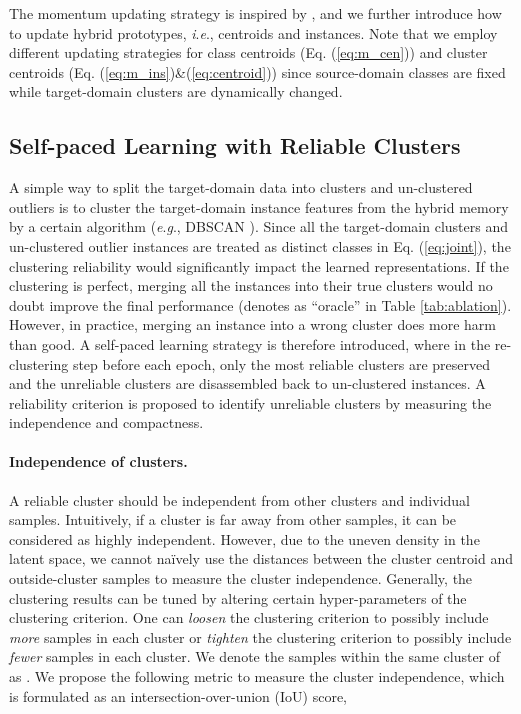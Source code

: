 \documentclass{article}
\newcommand{\ie}{\textit{i}.\textit{e}., }
\newcommand{\eg}{\textit{e}.\textit{g}., }
\begin{document}
The momentum updating strategy is inspired by \cite{he2019momentum,tarvainen2017mean}, and we further introduce how to update hybrid prototypes, \ie centroids and instances.
Note that we employ different updating strategies for class centroids (Eq. (\ref{eq:m_cen})) and cluster centroids (Eq. (\ref{eq:m_ins})\&(\ref{eq:centroid})) since source-domain classes are fixed while target-domain clusters are dynamically changed.






\subsection{Self-paced Learning with Reliable Clusters}
\label{sec:selfpaced}
\vspace{-5pt}


A simple way to split the target-domain data into clusters  and un-clustered outliers  is to cluster the target-domain instance features  from the hybrid memory by a certain algorithm (\eg DBSCAN \cite{ester1996density}).
Since all the target-domain clusters and un-clustered outlier instances are treated as distinct classes in Eq. (\ref{eq:joint}), the clustering reliability would significantly impact the learned representations.
If the clustering is perfect, merging all the instances into their true clusters would no doubt improve the final performance (denotes as ``oracle'' in Table \ref{tab:ablation}). 
However, in practice, merging an instance into a wrong cluster does more harm than good. 
A self-paced learning strategy is therefore introduced, where in the re-clustering step before each epoch, only the most reliable clusters are preserved and the unreliable clusters are disassembled back to un-clustered instances.
A reliability criterion is proposed to identify unreliable clusters by measuring the independence and compactness.


\vspace{-5pt}
\paragraph{Independence of clusters.}
A reliable cluster should be independent from other clusters and individual samples. Intuitively, if a cluster is far away from other samples, it can be considered as highly independent. However, due to the uneven density in the latent space, we cannot na\"ively use the distances between the cluster centroid and outside-cluster samples to measure the cluster independence. 
Generally, the clustering results can be tuned by altering certain hyper-parameters of the clustering criterion. 
One can \textit{loosen} the clustering criterion to possibly include \textit{more} samples in each cluster or \textit{tighten} the clustering criterion to possibly include \textit{fewer} samples in each cluster.
We denote the samples within the same cluster of  as .
We propose the following metric to measure the cluster independence, which is formulated as an intersection-over-union (IoU) score,
\end{document}
